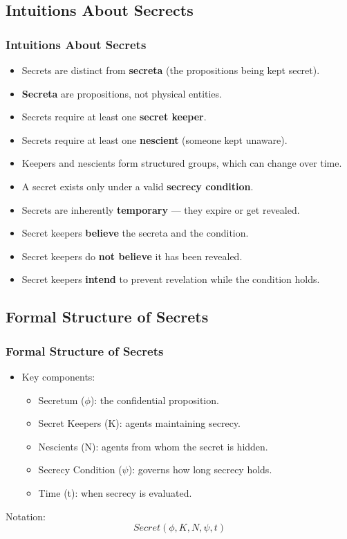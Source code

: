 \documentclass[aspectratio=169]{beamer}
\begin{document}
\subsection{Intuitions About Secrects}
\begin{frame}
\frametitle{Intuitions About Secrets}
\begin{itemize}
    \item Secrets are distinct from \textbf{secreta} (the propositions being kept secret).
    \item \textbf{Secreta} are propositions, not physical entities.
    \item Secrets require at least one \textbf{secret keeper}.
    \item Secrets require at least one \textbf{nescient} (someone kept unaware).
    \item Keepers and nescients form structured groups, which can change over time.
    \item A secret exists only under a valid \textbf{secrecy condition}.
    \item Secrets are inherently \textbf{temporary} — they expire or get revealed.
    \item Secret keepers \textbf{believe} the secreta and the condition.
    \item Secret keepers do \textbf{not believe} it has been revealed.
    \item Secret keepers \textbf{intend} to prevent revelation while the condition holds.
\end{itemize}
\end{frame}

\subsection{Formal Structure of Secrets}
\begin{frame}
\frametitle{Formal Structure of Secrets}
{\Large
\begin{itemize}
    \item Key components:
    \begin{itemize}
        \Large 
        \item Secretum ($\phi$): the confidential proposition.
        \item Secret Keepers (K): agents maintaining secrecy.
        \item Nescients (N): agents from whom the secret is hidden.
        \item Secrecy Condition ($\psi$): governs how long secrecy holds.
        \item Time (t): when secrecy is evaluated.
    \end{itemize}
\end{itemize}
}
{\small
\begin{block}{Notation:}
\[
Secret(\phi, K, N, \psi, t)
\]
\end{block}
}
\end{frame}
\end{document}

